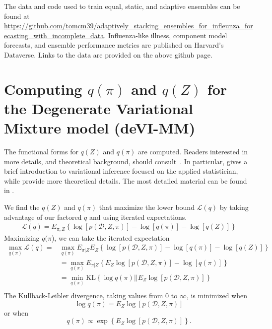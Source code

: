 \documentclass[12pt]{article}
\def\l{\left}
\def\r{\right}
\begin{document}
The data and code used to train equal, static, and adaptive ensembles can be found at \url{https://github.com/tomcm39/adaptively_stacking_ensembles_for_infleunza_forecasting_with_incomplete_data}.
Influenza-like illness, component model forecasts, and ensemble performance metrics are published on Harvard's Dataverse.
Links to the data are provided on the above github page.

\clearpage
\appendix

\section{Computing $q(\pi)$ and $q(Z)$ for the Degenerate Variational Mixture model (deVI-MM)} \label{sec:appendixA}

The functional forms for $q(Z)$ and $q(\pi)$ are computed.
Readers interested in more details, and theoretical background, should consult~\cite{rustagi1976variational,blei2017variational,bishop2006pattern,murphy2012machine}.
In particular, \cite{blei2017variational} gives a brief introduction to variational inference focused on the applied statistician, while \cite{bishop2006pattern,murphy2012machine} provide more theoretical details. 
The most detailed material can be found in \cite{rustagi1976variational}.

We find the $q(Z)$ and $q(\pi)$ that maximize the lower bound $\mathcal{L}(q)$ by taking advantage of our factored $q$ and using iterated expectations.
\begin{align}
  \mathcal{L}(q) = E_{\pi,Z} \l\{ \log\l[p(\mathcal{D},Z,\pi)\r] - \log[q(\pi)] - \log[q(Z)]\r\}
\end{align}
Maximizing $q(\pi$), we can take the iterated expectation
\begin{align*}
  \max_{q(\pi)} \mathcal{L}(q) =  &\max_{q(\pi)} E_{\pi|Z} E_{Z} \l\{ \log\l[p(\mathcal{D},Z,\pi)\r] - \log[q(\pi)] - \log[q(Z)]\r\}\\
  &=\max_{q(\pi)} E_{\pi|Z}  \l\{ E_{Z}\log\l[p(\mathcal{D},Z,\pi)\r] - \log[q(\pi)]\r\}\\
  &=\min_{q(\pi)} \text{KL}\l\{ \log q(\pi) ||  E_{Z}\log\l[p(\mathcal{D},Z,\pi)\r] \r\}\\
\end{align*}
The Kullback-Leibler divergence, taking values from 0 to $\infty$, is minimized when
\begin{equation*}
    \log q(\pi) = E_{Z}\log\l[p(\mathcal{D},Z,\pi)\r]
\end{equation*}
or when 
\begin{equation*}
   q(\pi) \propto \exp\l\{E_{Z}\log\l[p(\mathcal{D},Z,\pi)\r]\r\}.   
\end{equation*}
\end{document}
